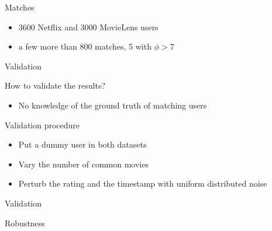 \begin{frame}{Matches}
\begin{block}{}
\begin{itemize}
	\item \num{3600} Netflix and \num{3000} MovieLens users
	\item a few more than 800 matches, 5 with $\phi>7$
\end{itemize}
\end{block}
\begin{figure}[H]
	\centering
	
\end{figure}
\end{frame}

\begin{frame}{Validation}
\begin{alertblock}{How to validate the results?}
	\begin{itemize}
		\item No knowledge of the ground truth of matching users
	\end{itemize}
\end{alertblock}%
\begin{exampleblock}{Validation procedure}
	\begin{itemize}
		\item Put a dummy user in both datasets
		\item Vary the number of common movies
		\item Perturb the rating and the timestamp with uniform distributed noise
	\end{itemize}
\end{exampleblock}
\end{frame}

\begin{frame}{Validation}
\begin{figure}[H]
	\centering
	
\end{figure}
\end{frame}

\begin{frame}{Robustness}
\begin{figure}[H]
	\centering
	\begin{subfigure}{\textwidth}
		\centering
		
	\end{subfigure}
	\begin{subfigure}{\textwidth}
		\centering
		
	\end{subfigure}
\end{figure}
\end{frame}


